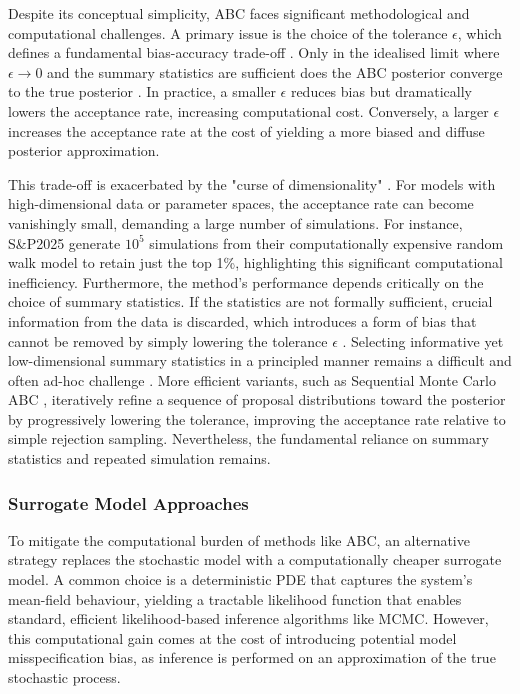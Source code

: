 \documentclass{article}
\newcommand{\SP}{S\&P2025}
\begin{document}
Despite its conceptual simplicity, ABC faces significant methodological and computational challenges. A primary issue is the choice of the tolerance $\epsilon$, which defines a fundamental bias-accuracy trade-off \citep{SunnkerABC,Blum2013}. Only in the idealised limit where $\epsilon \to 0$ and the summary statistics are sufficient does the ABC posterior converge to the true posterior \citep{Marin2012,Blum2013}. In practice, a smaller $\epsilon$ reduces bias but dramatically lowers the acceptance rate, increasing computational cost. Conversely, a larger $\epsilon$ increases the acceptance rate at the cost of yielding a more biased and diffuse posterior approximation.

This trade-off is exacerbated by the "curse of dimensionality" \citep{Blum2010,Blum2013}. For models with high-dimensional data or parameter spaces, the acceptance rate can become vanishingly small, demanding a large number of simulations. For instance, \SP{} generate $10^5$ simulations from their computationally expensive random walk model to retain just the top 1\%, highlighting this significant computational inefficiency. Furthermore, the method's performance depends critically on the choice of summary statistics. If the statistics are not formally sufficient, crucial information from the data is discarded, which introduces a form of bias that cannot be removed by simply lowering the tolerance $\epsilon$ \citep{Robert2011,Marin2012}. Selecting informative yet low-dimensional summary statistics in a principled manner remains a difficult and often ad-hoc challenge \citep{FearnheadPrangle2012,Blum2013}. More efficient variants, such as Sequential Monte Carlo ABC \citep{SissonFanTanaka2007,ToniWelchStrelkowaIpsenStumpf2009}, iteratively refine a sequence of proposal distributions toward the posterior by progressively lowering the tolerance, improving the acceptance rate relative to simple rejection sampling. Nevertheless, the fundamental reliance on summary statistics and repeated simulation remains.



\subsubsection{Surrogate Model Approaches}
To mitigate the computational burden of methods like ABC, an alternative strategy replaces the stochastic model with a computationally cheaper surrogate model. A common choice is a deterministic PDE that captures the system's mean-field behaviour, yielding a tractable likelihood function \citep{ErbanChapman2009,Baker2010} that enables standard, efficient likelihood-based inference algorithms like MCMC. However, this computational gain comes at the cost of introducing potential model misspecification bias, as inference is performed on an approximation of the true stochastic process.
\end{document}
